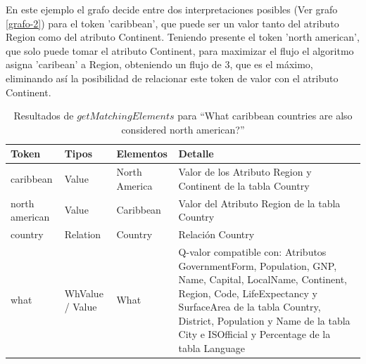 En este ejemplo el grafo decide entre dos interpretaciones posibles  (Ver grafo \ref{grafo-2}) para el token 'caribbean', que puede ser un valor tanto del atributo Region como del atributo Continent. Teniendo presente el token 'north american', que solo puede tomar el atributo Continent, para maximizar el flujo el algoritmo asigna 'caribean' a Region, obteniendo un flujo de 3, que es el máximo, eliminando así la posibilidad de relacionar este token de valor con el atributo Continent.

\begin{center}
\begin{table}[h]
\centering
\begin{tabular}{| p{2cm} | p{2cm} | p{2cm} | p{6cm} |}
\hline
Token & Tipos & Elementos & Detalle \\ \hline
caribbean & Value & North America & Valor de los Atributo Region y Continent de la tabla Country\\ \hline
north american & Value & Caribbean & Valor del Atributo Region de la tabla Country\\ \hline
country & Relation & Country & Relación Country\\ \hline
what & WhValue / Value & What & Q-valor compatible con: Atributos GovernmentForm, Population, GNP, Name, Capital, LocalName, Continent, Region, Code, LifeExpectancy y SurfaceArea de la tabla Country, District, Population y Name de la tabla City e ISOfficial y Percentage de la tabla Language\\ \hline
\end{tabular}
\caption{Resultados de $getMatchingElements$ para ``What caribbean countries are also considered north american?''}
\label{table:get-matching-elements-2}
\end{table}
\end{center}

